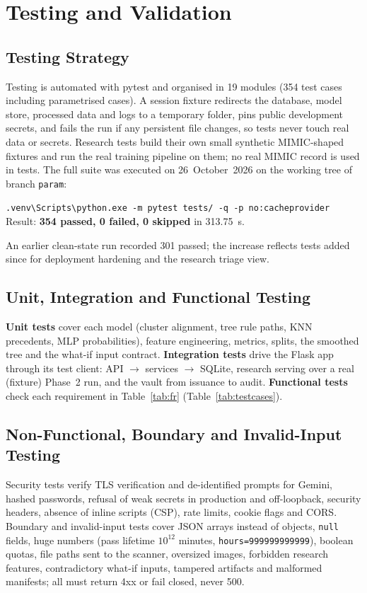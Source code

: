 \chapter{Testing and Validation}
\label{ch:testing}

\section{Testing Strategy}
Testing is automated with pytest and organised in 19 modules (354 test cases including parametrised
cases). A session fixture redirects the database, model store, processed data and logs to a temporary
folder, pins public development secrets, and fails the run if any persistent file changes, so tests never
touch real data or secrets. Research tests build their own small synthetic MIMIC-shaped fixtures and run
the real training pipeline on them; no real MIMIC record is used in tests. The full suite was executed on
26~October~2026 on the working tree of branch \texttt{param}:

\begin{center}
\texttt{.venv\textbackslash Scripts\textbackslash python.exe -m pytest tests/ -q -p no:cacheprovider}\\[2pt]
Result: \textbf{354 passed, 0 failed, 0 skipped} in 313.75~s.
\end{center}
\noindent An earlier clean-state run recorded 301 passed; the increase reflects tests added since for
deployment hardening and the research triage view.

\section{Unit, Integration and Functional Testing}
\textbf{Unit tests} cover each model (cluster alignment, tree rule paths, KNN precedents, MLP
probabilities), feature engineering, metrics, splits, the smoothed tree and the what-if input contract.
\textbf{Integration tests} drive the Flask app through its test client: API $\rightarrow$ services
$\rightarrow$ SQLite, research serving over a real (fixture) Phase~2 run, and the vault from issuance to
audit. \textbf{Functional tests} check each requirement in Table~\ref{tab:fr} (Table~\ref{tab:testcases}).

\section{Non-Functional, Boundary and Invalid-Input Testing}
Security tests verify TLS verification and de-identified prompts for Gemini, hashed passwords, refusal of
weak secrets in production and off-loopback, security headers, absence of inline scripts (CSP), rate
limits, cookie flags and CORS. Boundary and invalid-input tests cover JSON arrays instead of objects,
\texttt{null} fields, huge numbers (pass lifetime $10^{12}$ minutes, \texttt{hours=999999999999}), boolean
quotas, file paths sent to the scanner, oversized images, forbidden research features, contradictory
what-if inputs, tampered artifacts and malformed manifests; all must return 4xx or fail closed, never 500.

